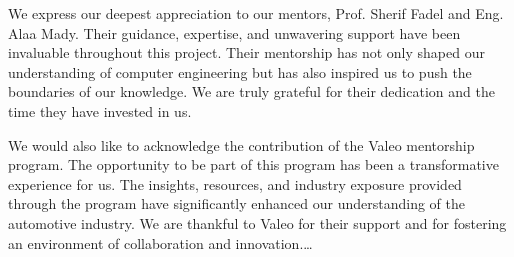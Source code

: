 \documentclass[
12pt,
oneside, 
onehalfspacing, 
nolistspacing, 
parskip, 
chapterinoneline, 
]{AASTCOMPUTER}
\author{Moustafa Mohamed Wahdan}
\begin{document}
\frontmatter 
\pagestyle{plain} 

\titlep

\declarationp

\examinersp

\begin{acknowledgmentsp}
	We express our deepest appreciation to our mentors, Prof. Sherif Fadel and Eng. Alaa Mady. Their guidance, expertise, and unwavering support have been invaluable throughout this project. Their mentorship has not only shaped our understanding of computer engineering but has also inspired us to push the boundaries of our knowledge. We are truly grateful for their dedication and the time they have invested in us.
	
	We would also like to acknowledge the contribution of the Valeo mentorship program. The opportunity to be part of this program has been a transformative experience for us. The insights, resources, and industry exposure provided through the program have significantly enhanced our understanding of the automotive industry. We are thankful to Valeo for their support and for fostering an environment of collaboration and innovation.\ldots
\end{acknowledgmentsp}
\end{document}
